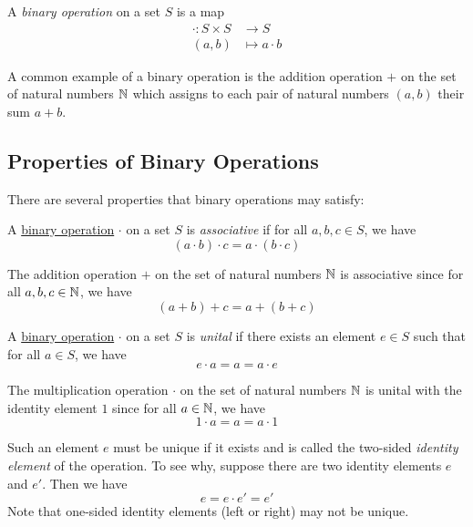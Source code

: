 \begin{definition}\label{def:binary_operation}
  A \emph{binary operation} on a set $S$ is a map
  \begin{align*}
    \cdot \colon S \times S & \to S             \\
    (a, b)             & \mapsto a \cdot b
  \end{align*}
\end{definition}

\begin{example}
  A common example of a binary operation is the addition operation $+$ on the set of natural numbers $\operatorname{\mathbb{N}}$ which assigns to each pair of natural numbers $(a, b)$ their sum $a + b$.
\end{example}

\subsection{Properties of Binary Operations}

There are several properties that binary operations may satisfy:

\begin{definition}[Associative]\label{def:associative}
  A \hyperref[def:binary_operation]{binary operation} $\cdot$ on a set $S$ is \emph{associative} if for all $a, b, c \in S$, we have
  \[ (a \cdot b) \cdot c = a \cdot (b \cdot c) \]
\end{definition}

\begin{example}
  The addition operation $+$ on the set of natural numbers $\operatorname{\mathbb{N}}$ is associative since for all $a, b, c \in \operatorname{\mathbb{N}}$, we have
  \[ (a + b) + c = a + (b + c) \]
\end{example}

\begin{definition}[Unital]\label{def:unital}
  A \hyperref[def:binary_operation]{binary operation} $\cdot$ on a set $S$ is \emph{unital} if there exists an element $e \in S$ such that for all $a \in S$, we have
  \[ e \cdot a = a = a \cdot e \]
\end{definition}

\begin{example}
  The multiplication operation $\cdot$ on the set of natural numbers $\operatorname{\mathbb{N}}$ is unital with the identity element $1$ since for all $a \in \operatorname{\mathbb{N}}$, we have
  \[ 1 \cdot a = a = a \cdot 1 \]
\end{example}

\begin{remark}
  Such an element $e$ must be unique if it exists and is called the two-sided \emph{identity element} of the operation. To see why, suppose there are two identity elements $e$ and $e'$. Then we have
  \[ e = e \cdot e' = e' \]
  Note that one-sided identity elements (left or right) may not be unique.
\end{remark}

